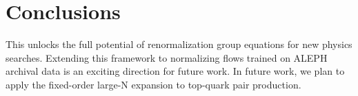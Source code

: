 \section{Conclusions}\label{sec:conclusions}

This unlocks the full potential of renormalization group equations for
new physics searches. Extending this framework to normalizing flows
trained on ALEPH archival data is an exciting direction for future work.
In future work, we plan to apply the fixed-order large-N expansion to
top-quark pair production.

